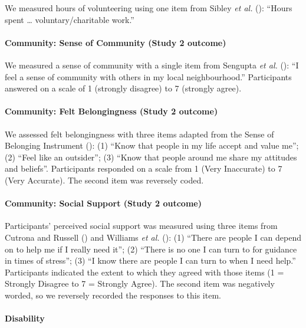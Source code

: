 \documentclass[
  single column]{article}
\let\oldparagraph\paragraph
\renewcommand{\paragraph}[1]{\oldparagraph{#1}\mbox{}}
\begin{document}
We measured hours of volunteering using one item from Sibley \emph{et
al.} (): ``Hours spent \ldots{}
voluntary/charitable work.''

\paragraph{Community: Sense of Community (Study 2
outcome)}\label{community-sense-of-community-study-2-outcome}

We measured a sense of community with a single item from Sengupta
\emph{et al.} (): ``I feel a sense of
community with others in my local neighbourhood.'' Participants answered
on a scale of 1 (strongly disagree) to 7 (strongly agree).

\paragraph{Community: Felt Belongingness (Study 2
outcome)}\label{community-felt-belongingness-study-2-outcome}

We assessed felt belongingness with three items adapted from the Sense
of Belonging Instrument (): (1) ``Know that people in my life accept and value me''; (2)
``Feel like an outsider''; (3) ``Know that people around me share my
attitudes and beliefs''. Participants responded on a scale from 1 (Very
Inaccurate) to 7 (Very Accurate). The second item was reversely coded.

\paragraph{Community: Social Support (Study 2
outcome)}\label{community-social-support-study-2-outcome}

Participants' perceived social support was measured using three items
from Cutrona and Russell () and Williams
\emph{et al.} (): (1)
``There are people I can depend on to help me if I really need it''; (2)
``There is no one I can turn to for guidance in times of stress''; (3)
``I know there are people I can turn to when I need help.'' Participants
indicated the extent to which they agreed with those items (1 = Strongly
Disagree to 7 = Strongly Agree). The second item was negatively worded,
so we reversely recorded the responses to this item.

\paragraph{Disability}\label{disability}
\end{document}
